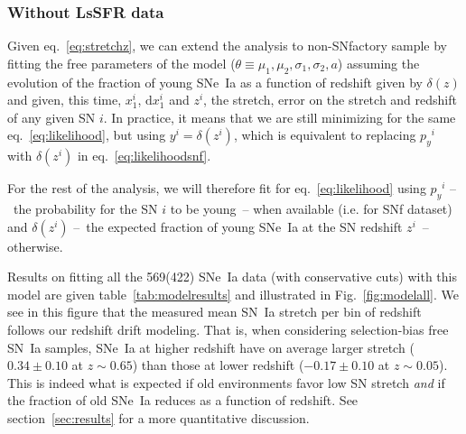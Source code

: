 \documentclass[]{aa} %
\newcommand{\mr}[1]{{\textcolor[rgb]{0.60,0.10,0.6}{#1}}}
\newcommand{\nn}[1]{{\textcolor[rgb]{1, 0.27, 0}{#1}}}
\begin{document}
\subsubsection{Without LsSFR data}
\label{sec:modelnopy}

Given eq.~\ref{eq:stretchz}, we can extend the analysis to non-SNfactory sample
by fitting the free parameters of the model ($\theta\equiv{\mu_1, \mu_2,
\sigma_1, \sigma_2, a}$) assuming the evolution of the fraction of young SNe~Ia
as a function of redshift given by $\delta(z)$ and given, this time, $x_1^{i}$,
$\mathrm{d}x^{i}_{1}$ and $z^{i}$, the stretch, error on the stretch and
redshift of any given SN $i$. In practice, it means that we are still minimizing
for the same eq.~\ref{eq:likelihood}, but \nn{using $y^i = \delta(z^i)$, which
is equivalent to replacing $p_y{}^i$ with $\delta(z^i)$ in
eq.~\ref{eq:likelihoodsnf}.}

\mr{For the rest of the analysis, we will therefore fit for
eq.~\ref{eq:likelihood} using \nn{$p_y{}^i$} --~the
probability for the SN $i$ to be young~-- when available (i.e. for SNf
dataset) and $\delta(z^{i})$ --~the expected fraction of young SNe~Ia at the
SN redshift $z^{i}$~-- otherwise.}

\mr{Results on fitting all the 569(422) SNe~Ia data (with conservative cuts)
with this model are given table~\ref{tab:modelresults} and illustrated in
Fig.~\ref{fig:modelall}. We see in this figure that the measured mean SN~Ia
stretch per bin of redshift follows our redshift drift modeling. That is, when
considering selection-bias free SN~Ia samples, SNe~Ia at higher redshift have on
average larger stretch ($0.34 \pm 0.10$ at $z\sim0.65$) than those at lower
redshift ($-0.17\pm 0.10$ at $z\sim0.05$). This is indeed what is expected if
old environments favor low SN stretch \citep[e.g.]{howell2007} \textit{and} if
the fraction of old SNe~Ia reduces as a function of redshift. See
section~\ref{sec:results} for a more quantitative discussion.}
\end{document}
